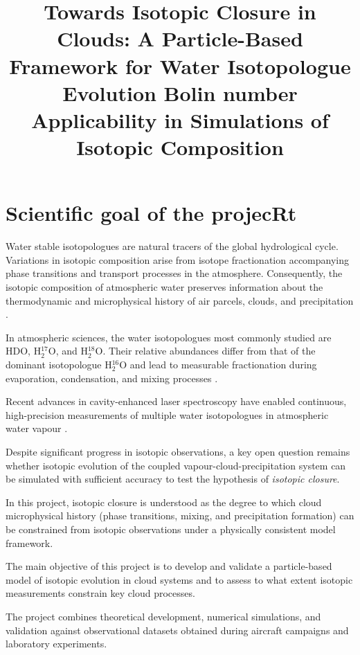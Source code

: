 \documentclass[12pt]{article}
\title{Towards Isotopic Closure in Clouds: A Particle-Based Framework for Water Isotopologue Evolution
Bolin number Applicability in Simulations of Isotopic Composition
}
\date{}
\begin{document}
\maketitle
\section{Scientific goal of the projecRt}
Water stable isotopologues are natural tracers of the global hydrological cycle.
Variations in isotopic composition arise from isotope fractionation accompanying
phase transitions and transport processes in the atmosphere.
Consequently, the isotopic composition of atmospheric water preserves information
about the thermodynamic and microphysical history of air parcels, clouds,
and precipitation \textcite{1961_Craig,2010_Gat, Daansgard?}.

In atmospheric sciences, the water isotopologues most commonly studied are HDO,
H$_2^{17}$O, and H$_2^{18}$O. Their relative abundances differ from that
of the dominant isotopologue H$_2^{16}$O and lead to measurable fractionation
during evaporation, condensation, and mixing processes 
\parencite{2008_Horita_EtAl,1975_Merlivat_Coantic,2003_Cappa_EtAl,2020_Gonfiantini_EtAl,2017_Lamb_EtAl,2022_Pierchala_EtAl}.


Recent advances in cavity-enhanced laser spectroscopy have enabled continuous,
high-precision measurements of multiple water isotopologues in atmospheric water vapour
\cite{2011_Tremoy_EtAl,2008_Wen_EtAl,2020_DeGraaf_EtAl}.

Despite significant progress in isotopic observations, a key open question remains
whether isotopic evolution of the coupled vapour-cloud-precipitation system can be
simulated with sufficient accuracy to test the hypothesis of \emph{isotopic closure}.

In this project, isotopic closure is understood as the degree to which cloud
microphysical history (phase transitions, mixing, and precipitation formation)
can be constrained from isotopic observations under a physically consistent model framework.

The main objective of this project is to develop and validate a particle-based model
of isotopic evolution in cloud systems and to assess to what extent isotopic
measurements constrain key cloud processes.

The project combines theoretical development, numerical simulations,
and validation against observational datasets obtained during aircraft campaigns
and laboratory experiments.
\end{document}
